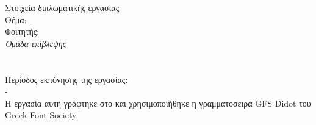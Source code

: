 
\pagestyle{empty}
\begin{center}
\Large{Στοιχεία διπλωματικής εργασίας}\\[1cm]
{\large Θέμα:}
\textbf{\large \doctitle}\\[1cm]
\large {Φοιτητής: \textbf{\nomme}\\[1cm]
\emph{\large{Ομάδα επίβλεψης}}\\[0.3cm]
\textbf{\supname}\\
\textbf{\didaktorikosOnoma}\\[1cm]
Περίοδος εκπόνησης της εργασίας:\\ {\arximonthyear} - {\telosmonthyear}\\[1cm]
Η εργασία αυτή γράφτηκε στο \XeLaTeX{} και χρησιμοποιήθηκε η γραμματοσειρά GFS Didot του Greek Font Society.}
\end{center}